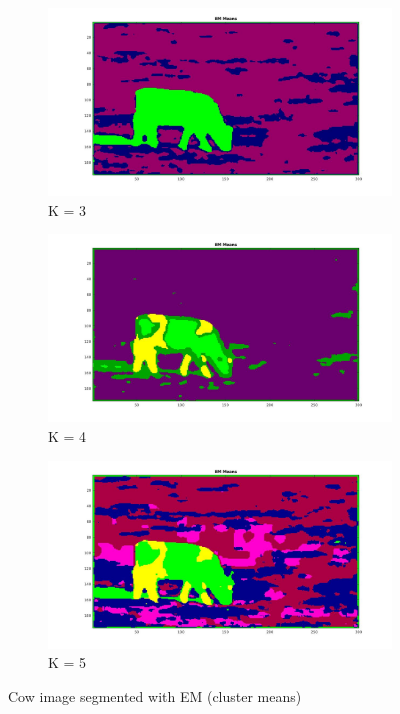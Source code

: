 \documentclass[paper=a4, fontsize=11pt]{scrartcl} %
\numberwithin{equation}{section} %
\numberwithin{figure}{section} %
\numberwithin{table}{section} %
\begin{document}
\begin{figure}
\centering
\begin{subfigure}{.3\textwidth}
  \centering
  \includegraphics[width=\linewidth]{cow/em3_means.jpg}
  \caption{K = 3}
\end{subfigure}
\begin{subfigure}{.3\textwidth}
  \centering
  \includegraphics[width=\linewidth]{cow/em4_means.jpg}
  \caption{K = 4}
\end{subfigure}
\begin{subfigure}{.3\textwidth}
  \centering
  \includegraphics[width=\linewidth]{cow/em5_means.jpg}
  \caption{K = 5}
\end{subfigure}
\caption{Cow image segmented with EM (cluster means)}
\label{fig:em_cow}
\end{figure}
\end{document}
